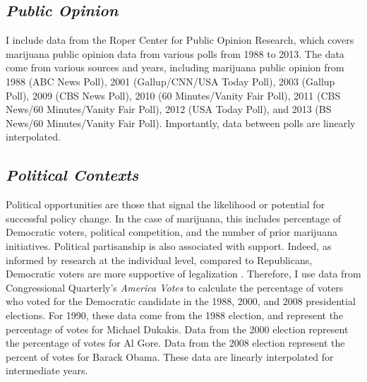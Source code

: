 \subsection{\it{Public Opinion}}

I include data from the Roper Center for Public Opinion Research, which covers marijuana public opinion data from various polls from 1988 to 2013. The data come from various sources and years, including marijuana public opinion from 1988 (ABC News Poll), 2001 (Gallup/CNN/USA Today Poll), 2003 (Gallup Poll), 2009 (CBS News Poll), 2010 (60 Minutes/Vanity Fair Poll), 2011 (CBS News/60 Minutes/Vanity Fair Poll), 2012 (USA Today Poll), and 2013 (BS News/60 Minutes/Vanity Fair Poll). Importantly, data between polls are linearly interpolated. 




%

\subsection{\it{Political Contexts}}

Political opportunities are those that signal the likelihood or potential for successful policy change. In the case of marijuana, this includes percentage of Democratic voters, political competition, and the number of prior marijuana initiatives. Political partisanship is also associated with support. Indeed, as informed by research at the individual level, compared to Republicans, Democratic voters are more supportive of legalization \citep{rosenthal_and_kubby_1996,caulkins_et_al_2012}. Therefore, I use data from Congressional Quarterly's {\it{America Votes}} to calculate the percentage of voters who voted for the Democratic candidate in the 1988, 2000, and 2008 presidential elections. For 1990, these data come from the 1988 election, and represent the percentage of votes for Michael Dukakis. Data from the 2000 election represent the percentage of votes for Al Gore. Data from the 2008 election represent the percent of votes for Barack Obama. These data are linearly interpolated for intermediate years. 


